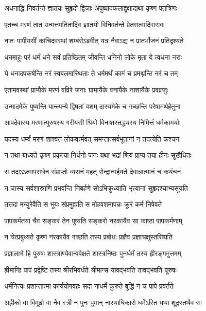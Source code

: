 \twolineshloka
{अधनाद्धि निवर्तन्ते ज्ञातयः सुहृदो द्विजाः}
{अपुष्पादफलाद्वृक्षाद्यथा कृष्ण पतत्रिणः}


\twolineshloka
{एतच्च मरणं तात उन्मत्तपतितादिव}
{ज्ञातयो विनिवर्तन्ते प्रेतसत्वादिवासवः}


\twolineshloka
{नातः पापीयसीं कांचिदवस्थां शम्बरोऽब्रवीत्}
{यत्र नैवाऽद्य न प्रातर्भोजनं प्रतिदृश्यते}


\twolineshloka
{धनमाहुः परं धर्मं धने सर्वं प्रतिष्ठितम्}
{जीवन्ति धनिनो लोके मृता ये त्वधना नराः}


\twolineshloka
{ये धनादपकर्षन्ति नरं स्वबलमास्थिताः}
{ते धर्ममर्थं कामं च प्रमथ्नन्ति नरं च तम्}


\twolineshloka
{एतामवस्थां प्राप्यैके मरणं वव्रिरे जनाः}
{ग्रामायैके वनायैके नाशायैके प्रवव्रजुः}


\twolineshloka
{उन्मादमेके पुष्यन्ति यान्त्यन्ये द्विषतां वशम्}
{दास्यमेके च गच्छन्ति परेषामर्थहेतुना}


\twolineshloka
{आपदेवास्य मरणात्पुरुषस्य गरीयसी}
{श्रियो विनाशस्तद्ध्यस्य निमित्तं धर्मकामयोः}


\twolineshloka
{यदस्य धर्म्यं मरणं शाश्वतं लोकवर्त्मवत्}
{समन्तात्सर्वभूतानां न तदत्येति कश्चन}


\twolineshloka
{न तथा बाध्यते कृष्ण प्रकृत्या निर्धनो जनः}
{यथा भद्रां श्रियं प्राप्य तया हीनः सुखैधितः}


\twolineshloka
{स तदाऽऽत्मापराधेन संप्राप्तो व्यसनं महत्}
{सेन्द्रान्गर्हयते देवान्नात्मानं च कथंचन}


\twolineshloka
{न चास्य सर्वशास्राणि प्रभवन्ति निबर्हणे}
{सोऽभिक्रुध्याति भृत्यानां सुहृदश्चाभ्यसूयति}


\twolineshloka
{तत्तदा मन्युरेवैति स भूयः संप्रमुह्यति}
{स मोहवशमापन्नः क्रूरं कर्म निषेवते}


\twolineshloka
{पापकर्मतया चैव सङ्करं तेन पुष्यति}
{सङ्करो नरकायैव सा काष्ठा पापकर्मणाम्}


\twolineshloka
{न चेत्प्रबुध्यते कृष्ण नरकायैव गच्छति}
{तस्य प्रबोधः प्रज्ञैव प्रज्ञाचक्षुस्तरिष्यति}


\twolineshloka
{प्रज्ञालाभे हि पुरुषः शास्त्राण्येवान्ववेक्षते}
{शास्त्रनिष्ठः पुनर्धर्मं तस्य ह्रीरङ्गमुत्तमम्}


\twolineshloka
{ह्रीमान्हि पापं प्रद्वेष्टि तस्य श्रीरभिवर्धते}
{श्रीमान्स यावद्भवति तावद्भवति पूरुषः}


\twolineshloka
{धर्मनित्यः प्रशान्तात्मा कार्ययोगवहः सदा}
{नाधर्मे कुरुते बुद्धिं न च पापे प्रवर्तते}


\twolineshloka
{अह्रीको वा विमूढो वा नैव स्त्री न पुनः पुमान्}
{नास्याधिकारो धर्मेऽस्ति यथा शूद्रस्तथैव सः}


